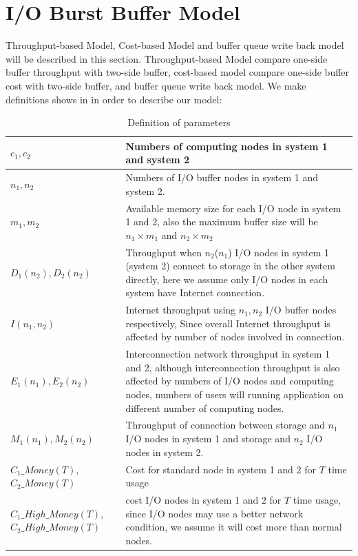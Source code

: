 \section{I/O Burst Buffer Model}


Throughput-based Model, Cost-based Model and buffer queue write back model will be described in this section.
Throughput-based Model compare one-side buffer throughput with two-side buffer, cost-based model compare one-side buffer cost with two-side buffer, and buffer queue write back model. 
We make definitions shows in  in order to describe our model:
\begin{table}[tb]
	\caption{Definition of parameters}
	\label{definition}
\begin{tabular}{|p{3cm}|p{5cm}|}
	\hline
	$c_1,c_2$&Numbers of computing nodes in system 1 and system 2\\\hline
	$n_1, n_2$&Numbers of I/O buffer nodes in system 1 and system 2.\\\hline
	$m_1,m_2$&Available memory size for each I/O node in system 1 and 2, also the maximum buffer size will be $n_1\times m_1$ and $n_2\times m_2$\\\hline
	$D_1(n_2),D_2(n_2)$&Throughput when $n_2$($n_1$) I/O nodes in system 1 (system 2) connect to storage in the other system directly, here we assume only I/O nodes in each system have Internet connection.\\\hline
	$I(n_1,n_2)$& 	Internet throughput using $n_1,n_2$ I/O buffer nodes respectively, Since overall Internet throughput is affected by number of nodes involved in connection.\\\hline
	$E_1(n_1), E_2(n_2)$&Interconnection network throughput in system 1 and 2, although interconnection throughput is also affected by numbers of I/O nodes and computing nodes, numbers of users will running application on different number of computing nodes.\\\hline
	$M_1(n_1),M_2(n_2)$& Throughput of connection between storage and $n_1$ I/O nodes in system 1 and storage and $n_2$ I/O nodes in system 2.\\\hline
	$C_1\_Money(T)$,$C_2\_Money(T)$& Cost for standard node in system 1 and 2 for $T$ time usage\\\hline
	$C_1\_High\_Money(T)$,$C_2\_High\_Money(T)$& cost I/O nodes in system 1 and 2 for $T$ time usage, since I/O nodes may use a better network condition, we assume it will cost more than normal nodes.\\\hline
\end{tabular}
\end{table}

